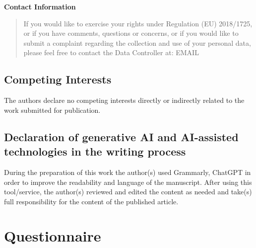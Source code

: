 \documentclass[
  12pt,
]{article}
\begin{document}
\textbf{Contact Information}

\begin{quote}
If you would like to exercise your rights under Regulation (EU) 2018/1725, or if you have comments, questions or concerns, or if you would like to submit a complaint regarding the collection and use of your personal data, please feel free to contact the Data Controller at: EMAIL
\end{quote}

\subsection{Competing Interests}\label{competing-interests}

The authors declare no competing interests directly or indirectly related to the work submitted for publication.

\subsection{Declaration of generative AI and AI-assisted technologies in the writing process}\label{declaration-of-generative-ai-and-ai-assisted-technologies-in-the-writing-process}

During the preparation of this work the author(s) used Grammarly, ChatGPT in order to improve the readability and language of the manuscript. After using this tool/service, the author(s) reviewed and edited the content as needed and take(s) full responsibility for the content of the published article.

\newpage

\section{Questionnaire}\label{sec:questionnaire}
\end{document}
